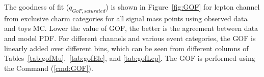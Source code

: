The goodness of fit ($q_{GoF, saturated}$) is shown in Figure~\ref{fig:GOF} for lepton channel from
exclusive charm categories for all signal mass points using observed data and toys MC. Lower the
value of GOF, the better is the agreement between data and model PDF. For different channels and
various event categories, the GOF is linearly added over different bins, which can be seen from
different columns of Tables~\ref{tab:gofMu},~\ref{tab:gofEle}, and \ref{tab:gofLep}. 
The GOF is performed using the Command (\ref{cmd:GOF}).
\begin{figure}
    \centering
    \vfil

\end{figure}
